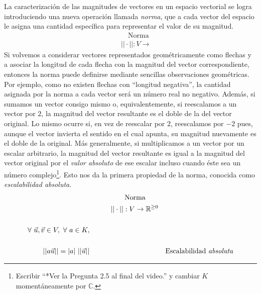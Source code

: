 \documentclass[12pt,dvipsnames]{article}
\numberwithin{equation}{section}
\begin{document}
La caracterización de las magnitudes de vectores en un espacio vectorial se logra introduciendo una nueva operación llamada \emph{norma}, que a cada vector del espacio le asigna una cantidad específica para representar el valor de su magnitud. 
\begin{align*}
     & & &\quad \text{Norma}& \\
     & & &||\cdot||:V\to &
\end{align*}
Si volvemos a considerar vectores representados geométricamente como flechas y a asociar la longitud de cada flecha con la magnitud del vector correspondiente, entonces la norma puede definirse mediante sencillas observaciones geométricas. Por ejemplo, como no existen flechas con ``longitud negativa'', la cantidad asignada por la norma a cada vector será un número real no negativo. Además, si sumamos un vector consigo mismo \textemdash o, equivalentemente, si reescalamos a un vector por $2$\textemdash, la magnitud del vector resultante es el doble de la del vector original. Lo mismo ocurre si, en vez de reescalar por $2$, reescalamos por $-2$ pues, aunque el vector invierta el sentido en el cual apunta, su magnitud nuevamente es el doble de la original. Más generalmente, si multiplicamos a un vector por un escalar arbitrario, la magnitud del vector resultante es igual a la magnitud del vector original por el \emph{valor absoluto} de ese escalar \textemdash incluso cuando éste sea un número complejo\footnote{Escribir ``*Ver la Pregunta 2.5 al final del video.'' y cambiar $K$ momentáneamente por $\mathbb{C}$.}. Esto nos da la primera propiedad de la norma, conocida como \emph{escalabilidad absoluta}. %
\begin{align*}
     &\quad \quad \quad \quad \quad \text{Norma}& \\
     &\quad \quad \quad ||\cdot||:V\to \mathbb{R}^{\ge0}& \\
     \\
     \forall \ \vec{u},\vec{v}\in V, \ \forall \ a\in K, \\
    \\
    ||a\vec{u}|| = |a| \ ||\vec{u}|| &&\text{Escalabilidad \emph{absoluta}} \\
\end{align*}
\end{document}
